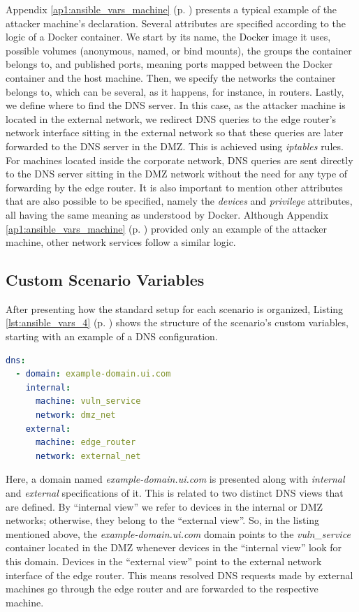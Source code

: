 Appendix \ref{ap1:ansible_vars_machine} (p. \pageref{ap1:ansible_vars_machine}) presents a typical example of the attacker machine's declaration. Several attributes are specified according to the logic of a Docker container. We start by its name, the Docker image it uses, possible volumes (anonymous, named, or bind mounts), the groups the container belongs to, and published ports, meaning ports mapped between the Docker container and the host machine. Then, we specify the networks the container belongs to, which can be several, as it happens, for instance, in routers. Lastly, we define where to find the DNS server. In this case, as the attacker machine is located in the external network, we redirect DNS queries to the edge router's network interface sitting in the external network so that these queries are later forwarded to the DNS server in the DMZ. This is achieved using \textit{iptables} rules. For machines located inside the corporate network, DNS queries are sent directly to the DNS server sitting in the DMZ network without the need for any type of forwarding by the edge router. It is also important to mention other attributes that are also possible to be specified, namely the \textit{devices} and \textit{privilege} attributes, all having the same meaning as understood by Docker. Although Appendix \ref{ap1:ansible_vars_machine} (p. \pageref{ap1:ansible_vars_machine}) provided only an example of the attacker machine, other network services follow a similar logic.

\subsection{Custom Scenario Variables} \label{sec:custom_scenario_variables}

After presenting how the standard setup for each scenario is organized, Listing \ref{lst:ansible_vars_4} (p. \pageref{lst:ansible_vars_4}) shows the structure of the scenario's custom variables, starting with an example of a DNS configuration.

\begin{lstlisting}[language=yaml,caption=Ansible Variables - DNS.,numbers=none,label={lst:ansible_vars_4}]
dns:
  - domain: example-domain.ui.com
    internal:
      machine: vuln_service
      network: dmz_net
    external:
      machine: edge_router
      network: external_net
\end{lstlisting}

Here, a domain named \textit{example-domain.ui.com} is presented along with \textit{internal} and \textit{external} specifications of it. This is related to two distinct DNS views that are defined. By ``internal view'' we refer to devices in the internal or DMZ networks; otherwise, they belong to the ``external view''. So, in the listing mentioned above, the \textit{example-domain.ui.com} domain points to the \textit{vuln\_service} container located in the DMZ whenever devices in the ``internal view'' look for this domain. Devices in the ``external view'' point to the external network interface of the edge router. This means resolved DNS requests made by external machines go through the edge router and are forwarded to the respective machine. 

